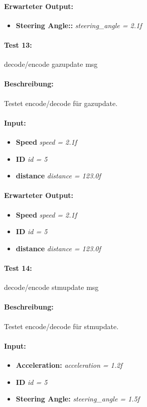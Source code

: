 \documentclass[a4paper, 12pt, titlepage]{scrartcl}
\begin{document}
{			\paragraph{Erwarteter Output:}
			\begin{itemize} \itemsep-0.5em
				\item \textbf{Steering Angle::} \emph{steering\_angle = 2.1f}
			\end{itemize}

			\paragraph{Test 13:}{decode/encode gazupdate msg}
			\paragraph{Beschreibung:} Testet encode/decode für gazupdate.
			\paragraph{Input:}
			\begin{itemize} \itemsep-0.5em
				\item \textbf{Speed} \emph{speed = 2.1f}
				\item \textbf{ID} \emph{id = 5}
				\item \textbf{distance} \emph{distance = 123.0f}
			\end{itemize}
			\paragraph{Erwarteter Output:}
			\begin{itemize} \itemsep-0.5em
				\item \textbf{Speed} \emph{speed = 2.1f}
				\item \textbf{ID} \emph{id = 5}
				\item \textbf{distance} \emph{distance = 123.0f}
			\end{itemize}

			\paragraph{Test 14:}{decode/encode stmupdate msg}
			\paragraph{Beschreibung:} Testet encode/decode für stmupdate.
			\paragraph{Input:}
			\begin{itemize} \itemsep-0.5em
				\item \textbf{Acceleration:} \emph{acceleration = 1.2f}
				\item \textbf{ID} \emph{id = 5}
				\item \textbf{Steering Angle:} \emph{steering\_angle = 1.5f}
			\end{itemize}
}
\end{document}
